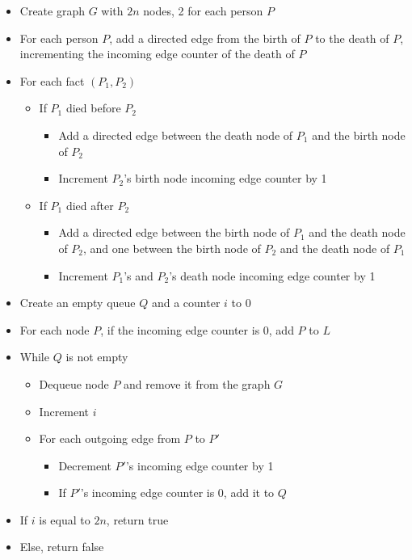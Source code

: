 \documentclass[11pt]{article}
\begin{document}
\begin{itemize}
\item Create graph $G$ with $2n$ nodes, 2 for each person $P$
\item For each person $P$, add a directed edge from the birth of $P$ to the death of $P$, incrementing the incoming edge counter of the death of $P$
\item For each fact $(P_1, P_2)$
\begin{itemize}
\item If $P_1$ died before $P_2$
\begin{itemize}
\item Add a directed edge between the death node of $P_1$ and the birth node of $P_2$
\item Increment $P_2$'s birth node incoming edge counter by 1
\end{itemize}
\item If $P_1$ died after $P_2$
\begin{itemize}
\item Add a directed edge between the birth node of $P_1$ and the death node of $P_2$, and one between the birth node of $P_2$ and the death node of $P_1$
\item Increment $P_1$'s and $P_2$'s death node incoming edge counter by 1
\end{itemize}
\end{itemize}
\item Create an empty queue $Q$ and a counter $i$ to 0
\item For each node $P$, if the incoming edge counter is 0, add $P$ to $L$
\item While $Q$ is not empty
\begin{itemize}
\item Dequeue node $P$ and remove it from the graph $G$
\item Increment $i$
\item For each outgoing edge from $P$ to $P'$
\begin{itemize}
\item Decrement $P'$'s incoming edge counter by 1
\item If $P'$'s incoming edge counter is 0, add it to $Q$
\end{itemize}
\end{itemize}
\item If $i$ is equal to $2n$, return true
\item Else, return false
\end{itemize}
\end{document}
